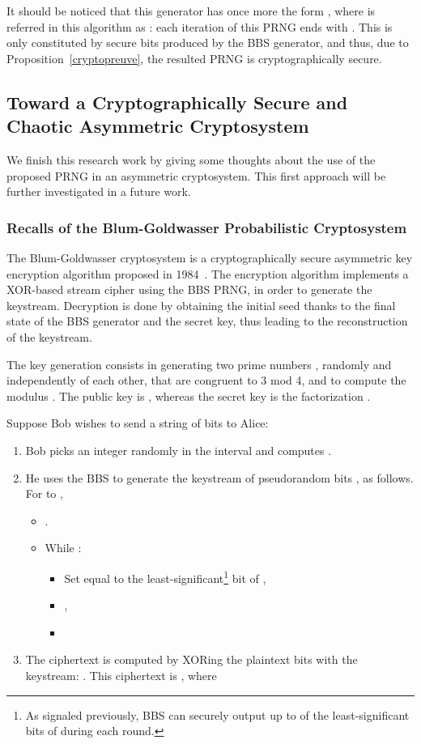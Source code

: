 \documentclass{article}
\begin{document}
It should  be noticed that this generator has once more the form ,
where  is referred in this algorithm as : each iteration of this
PRNG ends with . This  is only constituted
by secure bits produced by the BBS generator, and thus, due to
Proposition~\ref{cryptopreuve}, the resulted PRNG is cryptographically
secure.



\subsection{Toward a Cryptographically Secure and Chaotic Asymmetric Cryptosystem}
\label{Blum-Goldwasser}
We finish this research work by giving some thoughts about the use of
the proposed PRNG in an asymmetric cryptosystem.
This first approach will be further investigated in a future work.

\subsubsection{Recalls of the Blum-Goldwasser Probabilistic Cryptosystem}

The Blum-Goldwasser cryptosystem is a cryptographically secure asymmetric key encryption algorithm 
proposed in 1984~\cite{Blum:1985:EPP:19478.19501}.  The encryption algorithm 
implements a XOR-based stream cipher using the BBS PRNG, in order to generate 
the keystream. Decryption is done by obtaining the initial seed thanks to
the final state of the BBS generator and the secret key, thus leading to the
 reconstruction of the keystream.

The key generation consists in generating two prime numbers , 
randomly and independently of each other, that are
 congruent to 3 mod 4, and to compute the modulus .
The public key is , whereas the secret key is the factorization .


Suppose Bob wishes to send a string  of  bits to Alice:
\begin{enumerate}
\item Bob picks an integer  randomly in the interval  and computes .
\item He uses the BBS to generate the keystream of  pseudorandom bits , as follows. For  to ,
\begin{itemize}
\item .
\item While :
\begin{itemize}
\item Set  equal to the least-significant\footnote{As signaled previously, BBS can securely output up to  of the least-significant bits of  during each round.} bit of ,
\item ,
\item 
\end{itemize}
\end{itemize}
\item The ciphertext is computed by XORing the plaintext bits  with the keystream: . This ciphertext is , where 
\end{enumerate}
\end{document}
